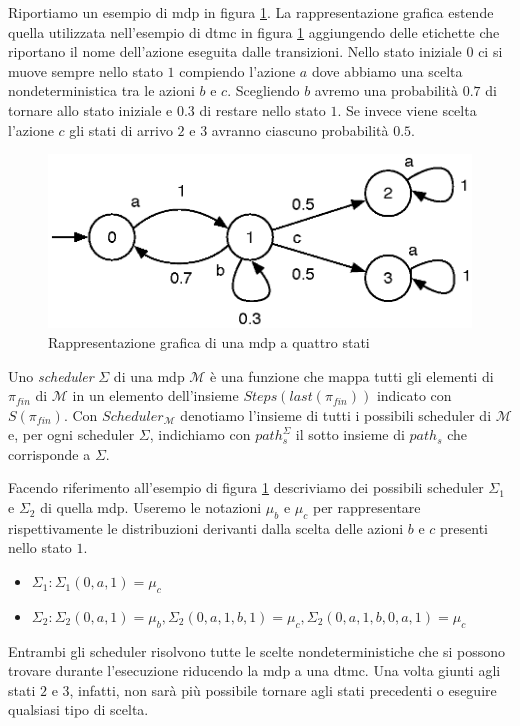 Riportiamo un esempio di \ac{mdp} in figura \ref{fig:mdp:esempio}. La rappresentazione grafica estende quella utilizzata nell'esempio di \ac{dtmc} in figura \ref{fig:mdp:esempio} aggiungendo delle etichette che riportano il nome dell'azione eseguita dalle transizioni. Nello stato iniziale $0$ ci si muove sempre nello stato $1$ compiendo l'azione $a$ dove abbiamo una scelta nondeterministica tra le azioni $b$ e $c$. Scegliendo $b$ avremo una probabilità $0.7$ di tornare allo stato iniziale e $0.3$ di restare nello stato $1$. Se invece viene scelta l'azione $c$ gli stati di arrivo $2$ e $3$ avranno ciascuno probabilità $0.5$.
\begin{figure}[htb]
	\begin{center}
		\includegraphics[width=.5\textwidth]{Images/exmdp}
	\end{center}
	\caption{Rappresentazione grafica di una \acs{mdp} a quattro stati}
	\label{fig:mdp:esempio}
\end{figure}

\begin{mtdef}[Scheduler]
	Uno \emph{scheduler} $\Sigma$ di una \ac{mdp} $\mathcal{M}$ è una funzione che mappa tutti gli elementi di $\pi_{fin}$ di $\mathcal{M}$ in un elemento dell'insieme $Steps(last(\pi_{fin}))$ indicato con $S(\pi_{fin})$. Con $Scheduler_{\mathcal{M}}$ denotiamo l'insieme di tutti i possibili scheduler di $\mathcal{M}$ e, per ogni scheduler $\Sigma$, indichiamo con $path_s^\Sigma$ il sotto insieme di $path_s$ che corrisponde a $\Sigma$.
\end{mtdef}

Facendo riferimento all'esempio di figura \ref{fig:mdp:esempio} descriviamo dei possibili scheduler $\Sigma_1$ e $\Sigma_2$ di quella \ac{mdp}. Useremo le notazioni $\mu_b$ e $\mu_c$ per rappresentare rispettivamente le distribuzioni derivanti dalla scelta delle azioni $b$ e $c$ presenti nello stato $1$.
\begin{itemize}
	\item $\Sigma_1 : \Sigma_1(0,a,1) = \mu_c$
	\item $\Sigma_2 : \Sigma_2(0,a,1) = \mu_b, \Sigma_2(0,a,1,b,1) = \mu_c, \Sigma_2(0,a,1,b,0,a,1) = \mu_c$
\end{itemize}
Entrambi gli scheduler risolvono tutte le scelte nondeterministiche che si possono trovare durante l'esecuzione riducendo la \ac{mdp} a una \ac{dtmc}. Una volta giunti agli stati $2$ e $3$, infatti, non sarà più possibile tornare agli stati precedenti o eseguire qualsiasi tipo di scelta.

